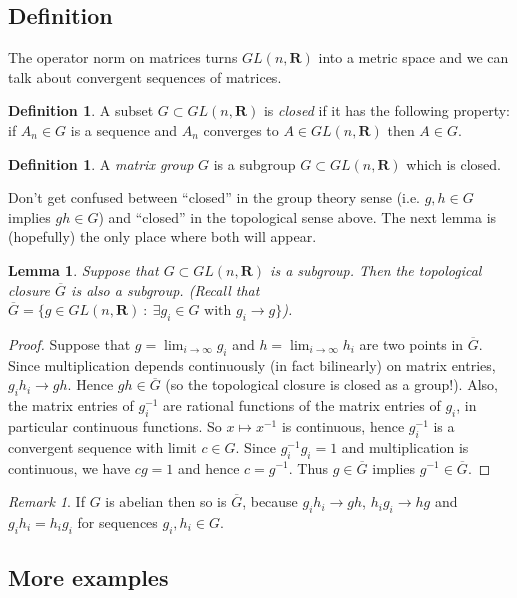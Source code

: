 \documentclass[12pt]{article}
\newcommand{\RR}{\mathbf{R}}
\newtheorem{lma}[thm]{Lemma}
\theoremstyle{definition}
\newtheorem{dfn}[thm]{Definition}
\theoremstyle{check}
\theoremstyle{remark}
\newtheorem{rmk}[thm]{Remark}
\theoremstyle{TheoremNum}
\begin{document}
\subsection{Definition}

The operator norm on matrices turns $GL(n,\RR)$ into a metric space and we can talk about convergent sequences of matrices.

\begin{dfn}
A subset $G\subset GL(n,\RR)$ is {\em closed} if it has the following property: if $A_n\in G$ is a sequence and $A_n$ converges to $A\in GL(n,\RR)$ then $A\in G$.
\end{dfn}

\begin{dfn}
A {\em matrix group} $G$ is a subgroup $G\subset GL(n,\RR)$ which is closed.
\end{dfn}

Don't get confused between ``closed'' in the group theory sense (i.e. $g,h\in G$ implies $gh\in G$) and ``closed'' in the topological sense above. The next lemma is (hopefully) the only place where both will appear.

\begin{lma}
Suppose that $G\subset GL(n,\RR)$ is a subgroup. Then the topological closure $\overline{G}$ is also a subgroup. (Recall that $\overline{G}=\{g\in GL(n,\RR)\ :\ \exists g_i\in G\mbox{ with }g_i\to g\}$).
\end{lma}
\begin{proof}
Suppose that $g=\lim_{i\to\infty}g_i$ and $h=\lim_{i\to\infty}h_i$ are two points in $\overline{G}$. Since multiplication depends continuously (in fact bilinearly) on matrix entries, $g_ih_i\to gh$. Hence $gh\in\overline{G}$ (so the topological closure is closed as a group!). Also, the matrix entries of $g_i^{-1}$ are rational functions of the matrix entries of $g_i$, in particular continuous functions. So $x\mapsto x^{-1}$ is continuous, hence $g_i^{-1}$ is a convergent sequence with limit $c\in G$. Since $g_i^{-1}g_i=1$ and multiplication is continuous, we have $cg=1$ and hence $c=g^{-1}$. Thus $g\in\overline{G}$ implies $g^{-1}\in\overline{G}$.
\end{proof}

\begin{rmk}
If $G$ is abelian then so is $\overline{G}$, because $g_ih_i\to gh$, $h_ig_i\to hg$ and $g_ih_i=h_ig_i$ for sequences $g_i,h_i\in G$.
\end{rmk}

\subsection{More examples}
\end{document}

